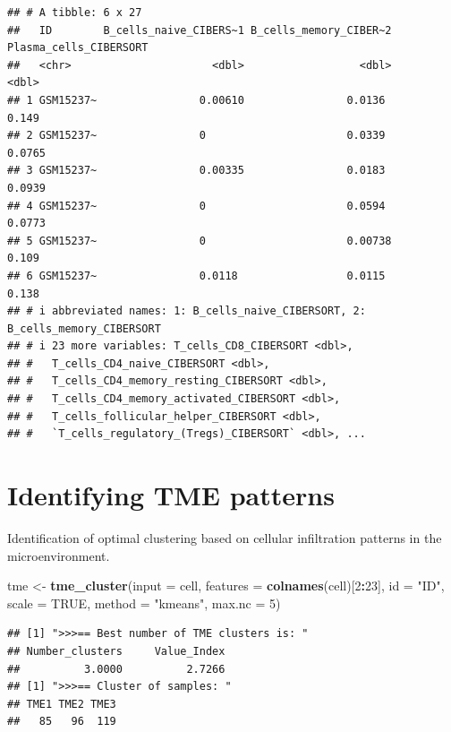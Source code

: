\documentclass[
  12pt,
]{book}
\newenvironment{Shaded}{\begin{snugshade}}{\end{snugshade}}
\newcommand{\AttributeTok}[1]{\textcolor[rgb]{0.13,0.29,0.53}{#1}}
\newcommand{\ConstantTok}[1]{\textcolor[rgb]{0.56,0.35,0.01}{#1}}
\newcommand{\DecValTok}[1]{\textcolor[rgb]{0.00,0.00,0.81}{#1}}
\newcommand{\FunctionTok}[1]{\textcolor[rgb]{0.13,0.29,0.53}{\textbf{#1}}}
\newcommand{\NormalTok}[1]{#1}
\newcommand{\OtherTok}[1]{\textcolor[rgb]{0.56,0.35,0.01}{#1}}
\newcommand{\SpecialCharTok}[1]{\textcolor[rgb]{0.81,0.36,0.00}{\textbf{#1}}}
\newcommand{\StringTok}[1]{\textcolor[rgb]{0.31,0.60,0.02}{#1}}
\begin{document}
\begin{verbatim}
## # A tibble: 6 x 27
##   ID        B_cells_naive_CIBERS~1 B_cells_memory_CIBER~2 Plasma_cells_CIBERSORT
##   <chr>                      <dbl>                  <dbl>                  <dbl>
## 1 GSM15237~                0.00610                0.0136                  0.149 
## 2 GSM15237~                0                      0.0339                  0.0765
## 3 GSM15237~                0.00335                0.0183                  0.0939
## 4 GSM15237~                0                      0.0594                  0.0773
## 5 GSM15237~                0                      0.00738                 0.109 
## 6 GSM15237~                0.0118                 0.0115                  0.138 
## # i abbreviated names: 1: B_cells_naive_CIBERSORT, 2: B_cells_memory_CIBERSORT
## # i 23 more variables: T_cells_CD8_CIBERSORT <dbl>,
## #   T_cells_CD4_naive_CIBERSORT <dbl>,
## #   T_cells_CD4_memory_resting_CIBERSORT <dbl>,
## #   T_cells_CD4_memory_activated_CIBERSORT <dbl>,
## #   T_cells_follicular_helper_CIBERSORT <dbl>,
## #   `T_cells_regulatory_(Tregs)_CIBERSORT` <dbl>, ...
\end{verbatim}

\hypertarget{identifying-tme-patterns}{%
\section{Identifying TME patterns}\label{identifying-tme-patterns}}

Identification of optimal clustering based on cellular infiltration patterns in the microenvironment.

\begin{Shaded}
\begin{Highlighting}[]
\NormalTok{tme }\OtherTok{\textless{}{-}} \FunctionTok{tme\_cluster}\NormalTok{(}\AttributeTok{input =}\NormalTok{ cell, }\AttributeTok{features =} \FunctionTok{colnames}\NormalTok{(cell)[}\DecValTok{2}\SpecialCharTok{:}\DecValTok{23}\NormalTok{], }\AttributeTok{id =} \StringTok{"ID"}\NormalTok{, }\AttributeTok{scale =} \ConstantTok{TRUE}\NormalTok{, }\AttributeTok{method =} \StringTok{"kmeans"}\NormalTok{, }\AttributeTok{max.nc =} \DecValTok{5}\NormalTok{)}
\end{Highlighting}
\end{Shaded}

\begin{verbatim}
## [1] ">>>== Best number of TME clusters is: "
## Number_clusters     Value_Index 
##          3.0000          2.7266 
## [1] ">>>== Cluster of samples: "
## TME1 TME2 TME3 
##   85   96  119
\end{verbatim}
\end{document}
